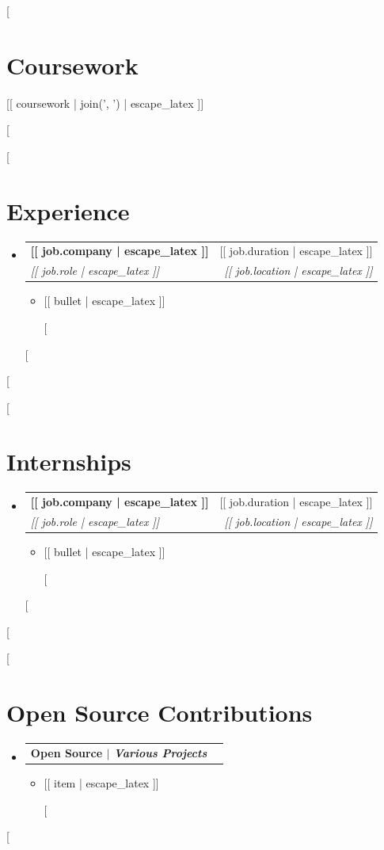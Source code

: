 \documentclass[letterpaper,11pt]{article}
\makeatletter
\newcommand{\resumeItemPlain}[1]{
  \item\small{#1 \vspace{-2pt}}
}
\newcommand{\resumeSubheading}[4]{
  \vspace{-1pt}\item
    \begin{tabular*}{0.97\textwidth}{l@{\extracolsep{\fill}}r}
      \textbf{#1} & #2 \\
      \textit{\small#3} & \textit{\small #4} \\
    \end{tabular*}\vspace{-5pt}
}
\newcommand{\resumeProjectHeading}[2]{
  \vspace{-1pt}\item
    \begin{tabular*}{0.97\textwidth}{l@{\extracolsep{\fill}}r}
      \textbf{#1} & \textit{\small #2} \\
    \end{tabular*}\vspace{-5pt}
}
\newcommand{\resumeSubHeadingListStart}{\begin{itemize}[leftmargin=*]}
\newcommand{\resumeSubHeadingListEnd}{\end{itemize}}
\newcommand{\resumeItemListStart}{\begin{itemize}}
\newcommand{\resumeItemListEnd}{\end{itemize}\vspace{-5pt}}
\makeatother
\begin{document}
[%
\section{Coursework}
 \begin{itemize}[leftmargin=0.15in, label={}]
    \small{\item{[[ coursework | join(', ') | escape_latex ]]}}
 \end{itemize}
 \vspace{-16pt}
[%

[%
\section{Experience}
  \resumeSubHeadingListStart
    [%
    \resumeSubheading
      {[[ job.company | escape_latex ]]}{[[ job.duration | escape_latex ]]}
      {[[ job.role | escape_latex ]]}{[[ job.location | escape_latex ]]}
      \resumeItemListStart
        [%
        \resumeItemPlain{[[ bullet | escape_latex ]]}
        [%
      \resumeItemListEnd
    [%
  \resumeSubHeadingListEnd
\vspace{-16pt}
[%

[%
\section{Internships}
  \resumeSubHeadingListStart
    [%
    \resumeSubheading
      {[[ job.company | escape_latex ]]}{[[ job.duration | escape_latex ]]}
      {[[ job.role | escape_latex ]]}{[[ job.location | escape_latex ]]}
      \resumeItemListStart
        [%
        \resumeItemPlain{[[ bullet | escape_latex ]]}
        [%
      \resumeItemListEnd
    [%
  \resumeSubHeadingListEnd
\vspace{-16pt}
[%

[%
\section{Open Source Contributions}
  \resumeSubHeadingListStart
    \resumeProjectHeading
        {\textbf{Open Source} $|$ \emph{Various Projects}}{}
        \resumeItemListStart
          [%
          \resumeItemPlain{[[ item | escape_latex ]]}
          [%
        \resumeItemListEnd
  \resumeSubHeadingListEnd
[%
\end{document}
